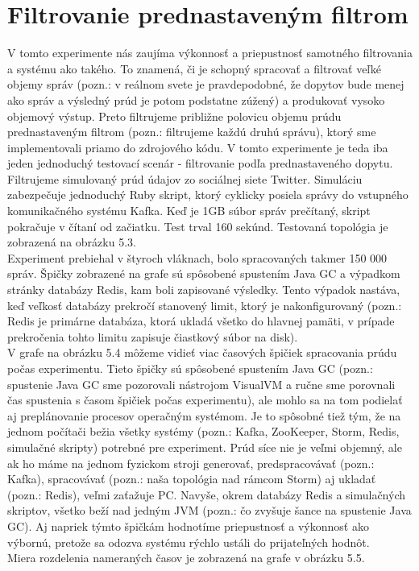 \section{Filtrovanie prednastaveným filtrom}
V tomto experimente nás zaujíma výkonnosť  a priepustnosť samotného filtrovania a systému ako takého. To znamená, či je schopný spracovať a filtrovať veľké objemy správ (pozn.: v reálnom svete je pravdepodobné, že dopytov bude menej ako správ a výsledný prúd je potom podstatne zúžený) a produkovať vysoko objemový výstup. Preto filtrujeme približne polovicu objemu prúdu prednastaveným filtrom (pozn.: filtrujeme každú druhú správu), ktorý sme implementovali priamo do zdrojového kódu. V tomto experimente je teda iba jeden jednoduchý testovací scenár - filtrovanie podľa prednastaveného dopytu. Filtrujeme simulovaný prúd údajov zo sociálnej siete Twitter. Simuláciu zabezpečuje jednoduchý Ruby skript, ktorý cyklicky posiela správy do vstupného komunikačného systému Kafka. Keď je 1GB súbor správ prečítaný, skript pokračuje v čítaní od začiatku. Test trval 160 sekúnd. Testovaná topológia je zobrazená na obrázku 5.3. 
\\[5pt]
Experiment prebiehal v štyroch vláknach, bolo spracovaných takmer 150 000 správ. Špičky zobrazené na grafe sú spôsobené spustením Java GC a výpadkom stránky databázy Redis, kam boli zapisované výsledky. Tento výpadok nastáva, keď veľkosť databázy prekročí stanovený limit, ktorý je nakonfigurovaný (pozn.: Redis je primárne databáza, ktorá ukladá všetko do hlavnej pamäti, v prípade prekročenia tohto limitu zapisuje čiastkový súbor na disk). 
\\[5pt]
V grafe na obrázku 5.4 môžeme vidieť viac časových špičiek spracovania prúdu počas experimentu. Tieto špičky sú spôsobené spustením Java GC (pozn.: spustenie Java GC sme pozorovali nástrojom VisualVM a ručne sme porovnali čas spustenia s časom špičiek počas experimentu), ale mohlo sa na tom podielať aj preplánovanie procesov operačným systémom. 
Je to spôsobné tiež tým, že na jednom počítači bežia všetky systémy (pozn.: Kafka, ZooKeeper, Storm, Redis, simulačné skripty) potrebné pre experiment. 
Prúd síce nie je veľmi objemný, ale ak ho máme na jednom fyzickom stroji generovať, predspracovávať (pozn.: Kafka), spracovávať (pozn.: naša topológia nad rámcom Storm) aj ukladať (pozn.: Redis), veľmi zaťažuje PC. 
Navyše, okrem databázy Redis a simulačných skriptov, všetko beží nad jedným JVM (pozn.: čo zvyšuje šance na spustenie Java GC). Aj napriek týmto špičkám hodnotíme priepustnosť a výkonnosť ako výbornú, pretože sa odozva systému rýchlo ustáli do prijateľných hodnôt. 
\\[5pt]
Miera rozdelenia nameraných časov je zobrazená na grafe v obrázku 5.5.

